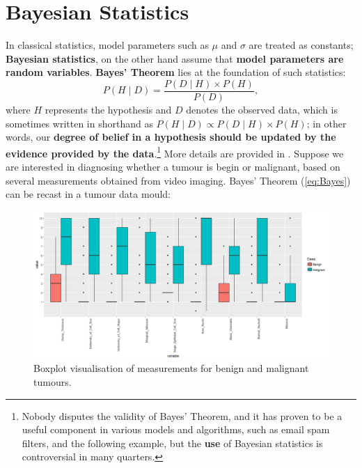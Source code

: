 \section{Bayesian Statistics}
In classical statistics, model parameters such as $\mu$ and $\sigma$ are treated as constants; \textbf{Bayesian statistics}, on the other hand assume that \textbf{model parameters are random variables}. \newl \textbf{Bayes' Theorem} lies at the foundation of such statistics: 
\begin{equation}\label{eq:Bayes}
    P(H\mid D)=\frac{P(D\mid H)\times P(H)}{P(D)},
\end{equation}
where $H$ represents the hypothesis and $D$ denotes the observed data, which is sometimes written in shorthand as  $P(H\mid D) \propto P(D\mid H)\times P(H)$; in other words, our \textbf{degree of belief in a hypothesis should be updated by the evidence provided by the data}.\footnote{Nobody disputes the validity of Bayes' Theorem, and it has proven to be a useful component in various models and algorithms, such as email spam filters, and the following example, but the \textbf{use} of Bayesian statistics is controversial in many quarters.} More details are provided in \cite{DSRS_BDA}.\newl 
Suppose we are interested in diagnosing whether a tumour is begin or malignant, based on several measurements obtained from video imaging. Bayes' Theorem (\ref{eq:Bayes}) can be recast in a tumour data mould:
 \begin{figure}[!t]
    \centering
      \includegraphics[width=\textwidth]{Images/testA10.png}
      \caption[\small Visualisation of tumour measurements]{\small Boxplot visualisation of measurements for benign and malignant tumours.}
      \label{fig:testA10}
    \end{figure}
    
